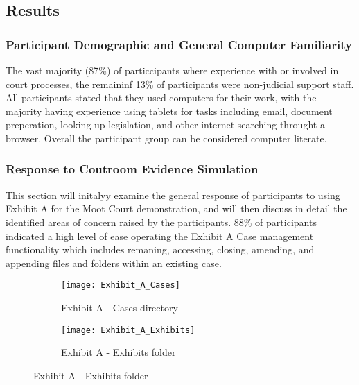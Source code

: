 \subsection{Results}
\subsubsection{Participant Demographic and General Computer Familiarity}
The vast majority (87\%) of particcipants where experience with or involved in court processes, the remaininf 13\% of participants were non-judicial support staff. All participants stated that they used computers for their work, with the majority having experience using tablets for tasks including email, document preperation, looking up legislation, and other internet searching throught a browser.
Overall the participant group can be considered computer literate.

\subsubsection{Response to Coutroom Evidence Simulation}
This section will initalyy examine the general response of participants to using Exhibit A for the Moot Court demonstration, and will then discuss in detail the identified areas of concern raised by the participants.
88\% of participants indicated a high level of ease operating the Exhibit A Case management functionality which includes remaning, accessing, closing, amending, and appending files and folders within an existing case. 

    







\begin{figure}[h]
\centering
\begin{subfigure}[]{0.4\textwidth}
        
        \texttt{[image: Exhibit\_A\_Cases]}
        \caption{Exhibit A - Cases directory}
        \label{fig:exhibit_a_cases_Directory}
    \end{subfigure}
    
    \begin{subfigure}[t]{0.4\textwidth}
        
        \texttt{[image: Exhibit\_A\_Exhibits]}
        \caption{Exhibit A - Exhibits folder}
        \label{fig:exhibit_a_exhibits_folder}
    \end{subfigure}%

\end{figure}

